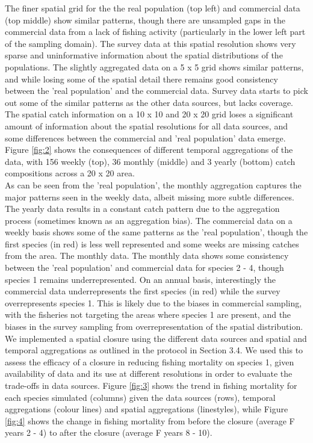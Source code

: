 \documentclass[review]{elsarticle}
\begin{document}
The finer spatial grid for the the real population (top left) and commercial
data (top middle) show similar patterns, though there are unsampled gaps in the
commercial data from a lack of fishing activity (particularly in the lower left
part of the sampling domain). The survey data at this spatial resolution shows
very sparse and uninformative information about the spatial distributions of
the populations. The slightly aggregated data on a 5 x 5 grid shows similar
patterns, and while losing some of the spatial detail there remains good
consistency between the 'real population' and the commercial data. Survey data
starts to pick out some of the similar patterns as the other data sources, but
lacks coverage. The spatial catch information on a 10 x 10 and 20 x 20 grid
loses a significant amount of information about the spatial resolutions for all
data sources, and some differences between the commercial and 'real population'
data emerge. \\

Figure \ref{fig:2} shows the consequences of different temporal aggregations of
the data, with 156 weekly (top), 36 monthly (middle) and 3 yearly (bottom)
catch compositions across a 20 x 20 area. \\

As can be seen from the 'real population', the monthly aggregation captures the
major patterns seen in the weekly data, albeit missing more subtle differences.
The yearly data results in a constant catch pattern due to the aggregation
process (sometimes known as an aggregation bias). The commercial data on a
weekly basis shows some of the same patterns as the 'real population', though
the first species (in red) is less well represented and some weeks are missing
catches from the area. The monthly data. The monthly data shows some
consistency between the 'real population' and commercial data for species 2 -
4, though species 1 remains underrepresented. On an annual basis, interestingly
the commercial data underrepresents the first species (in red) while the survey
overrepresents species 1. This is likely due to the biases in commercial
sampling, with the fisheries not targeting the areas where species 1 are
present, and the biases in the survey sampling from overrepresentation of the
spatial distribution. \\

We implemented a spatial closure using the different data sources and spatial
and temporal aggregations as outlined in the protocol in Section 3.4. We used
this to assess the efficacy of a closure in reducing fishing mortality on
species 1, given availability of data and its use at different resolutions in
order to evaluate the trade-offs in data sources. Figure \ref{fig:3} shows the
trend in fishing mortality for each species simulated (columns) given the data
sources (rows), temporal aggregations (colour lines) and spatial aggregations
(linestyles), while Figure \ref{fig:4} shows the change in fishing mortality
from before the closure (average F years 2 - 4) to after the closure (average F
years 8 - 10). \\
\end{document}
